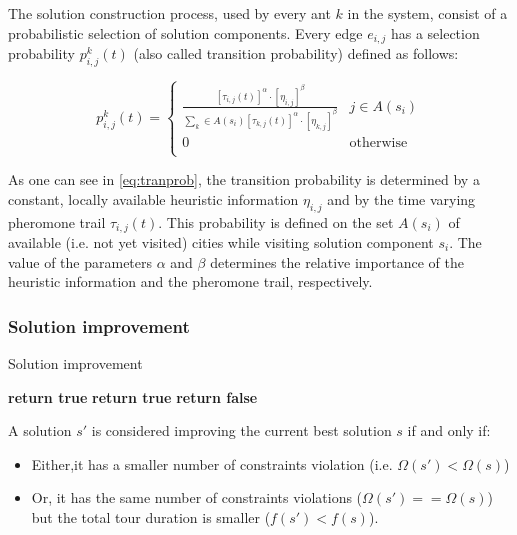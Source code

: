 \begin{homeworkProblem}
The solution construction process, used by every ant $k$ in the system, consist of a probabilistic selection of solution components.
Every edge $e_{i,j}$ has a selection probability $p_{i,j}^k(t)$ (also called transition probability) defined as follows:

\begin{equation} \label{eq:tranprob}
p_{i,j}^k(t) = \begin{cases}
  \frac{[\tau_{i,j}(t)]^\alpha \cdot [\eta_{i,j}]^\beta}{\sum_{k} \in A(s_{i}) [\tau_{k,j}(t)]^\alpha \cdot [\eta_{k,j}]^\beta} & j \in A(s_{i}) \\
 0 & \text{otherwise} \\
\end{cases}
\end{equation}

As one can see in \ref{eq:tranprob}, the transition probability is determined by a constant, locally available heuristic information $\eta_{i,j}$ and by the time varying pheromone trail $\tau_{i,j}(t)$.
This probability is defined on the set $A(s_i)$ of available (i.e. not yet visited) cities while visiting solution component $s_i$.
The value of the parameters $\alpha$ and $\beta$ determines the relative importance of the heuristic information and the pheromone trail, respectively.

\subsubsection{Solution improvement}
\begin{algorithm}[!h]
  \caption{Solution improvement}\label{sol}
  \begin{algorithmic}[1]
          \State \textbf{return true}
      \Else
            \State \textbf{return true}
           \EndIf
      \EndIf
      \State \textbf{return false}
      \EndProcedure
\end{algorithmic}
\end{algorithm}

A solution $s'$ is considered improving the current best solution $s$ if and only if:
\begin{itemize}
  \item Either,it has a smaller number of constraints violation (i.e. $\Omega(s') < \Omega(s)$)
  \item Or, it has the same number of constraints violations ($\Omega(s') == \Omega(s)$) but the total tour duration is smaller ($f(s') < f(s)$).
\end{itemize}



\end{homeworkProblem}
